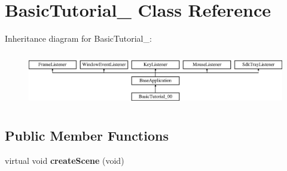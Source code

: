 \hypertarget{class_basic_tutorial__00}{}\section{Basic\+Tutorial\+\_ Class Reference}
\label{class_basic_tutorial__00}
Inheritance diagram for Basic\+Tutorial\+\_\+:\begin{figure}[H]
\begin{center}
\leavevmode
\includegraphics[height=2.382979cm]{class_basic_tutorial__00}
\end{center}
\end{figure}
\subsection*{Public Member Functions}
\begin{DoxyCompactItemize}
\item 
\mbox{\label{class_basic_tutorial__00_a15a3d4673724ec99077ce992f996a550}} 
virtual void {\bfseries create\+Scene} (void)
\end{DoxyCompactItemize}
